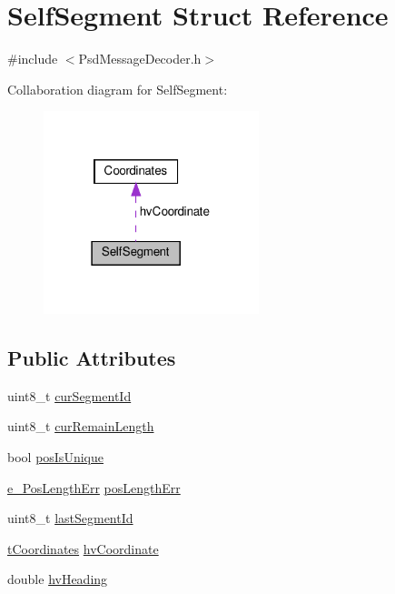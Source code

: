 \hypertarget{struct_self_segment}{}\section{Self\+Segment Struct Reference}
\label{struct_self_segment}


{\ttfamily \#include $<$Psd\+Message\+Decoder.\+h$>$}



Collaboration diagram for Self\+Segment\+:\nopagebreak
\begin{figure}[H]
\begin{center}
\leavevmode
\includegraphics[width=178pt]{struct_self_segment__coll__graph}
\end{center}
\end{figure}
\subsection*{Public Attributes}
\begin{DoxyCompactItemize}
\item 
uint8\+\_\+t \hyperlink{struct_self_segment_a0bb36b5efe9c32319d685f13e458a5d0}{cur\+Segment\+Id}
\item 
uint8\+\_\+t \hyperlink{struct_self_segment_a2eb5169bc62a6c1945218e6a23a01aea}{cur\+Remain\+Length}
\item 
bool \hyperlink{struct_self_segment_adc13c811ad05f192237b55be4c2468bd}{pos\+Is\+Unique}
\item 
\hyperlink{_psd_message_decoder_8h_a954d216bca8cdfc325504c05bb6c4336}{e\+\_\+\+Pos\+Length\+Err} \hyperlink{struct_self_segment_a3fb749f98032e0f439c64722cdcc7cea}{pos\+Length\+Err}
\item 
uint8\+\_\+t \hyperlink{struct_self_segment_a288eff27cbe3c5986dbdacfd12141675}{last\+Segment\+Id}
\item 
\hyperlink{_psd_message_decoder_8h_a559ada7297c8c6c2337f9e233e73aeca}{t\+Coordinates} \hyperlink{struct_self_segment_a7777e101b62ea11f2030bbe078cb4557}{hv\+Coordinate}
\item 
double \hyperlink{struct_self_segment_a05eb5f224252e2c1e7d29b7da69b2dc2}{hv\+Heading}
\end{DoxyCompactItemize}


